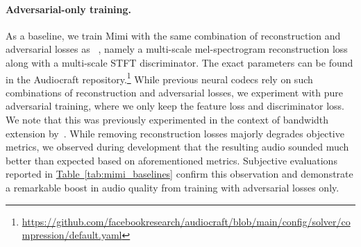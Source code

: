 \paragraph{Adversarial-only training.}
As a baseline, we train Mimi with the same combination of reconstruction and adversarial losses as ~\citet{encodec}, namely a multi-scale mel-spectrogram reconstruction loss along with a multi-scale STFT discriminator. The exact parameters can be found in the Audiocraft repository.\footnote{\url{https://github.com/facebookresearch/audiocraft/blob/main/config/solver/compression/default.yaml}} While previous neural codecs rely on such combinations of reconstruction and adversarial losses, we experiment with pure adversarial training, where we only keep the feature loss and discriminator loss. We note that this was previously experimented in the context of bandwidth extension by~\citet{hauret2023eben}. While removing reconstruction losses majorly degrades objective metrics, we observed during development that the resulting audio sounded much better than expected based on aforementioned metrics. Subjective evaluations reported in \hyperref[tab:mimi_baselines]{Table~\ref{tab:mimi_baselines}} confirm this observation and demonstrate a remarkable boost in audio quality from training with adversarial losses only.

